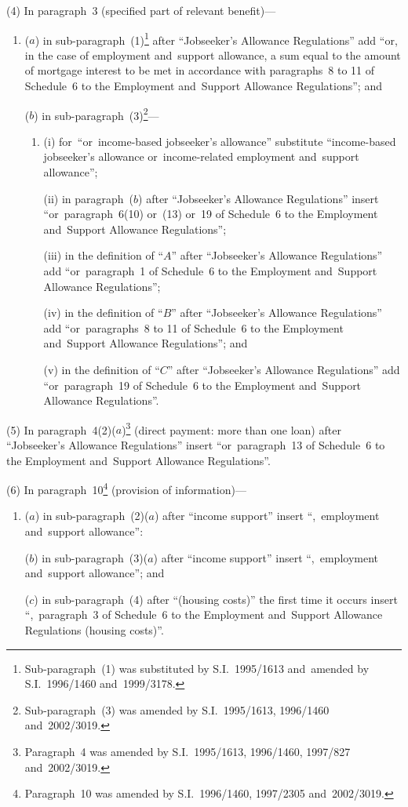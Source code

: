 \documentclass[12pt,a4paper]{article}
\begin{document}
(4) In paragraph~3 (specified part of relevant benefit)—
\begin{enumerate}\item[]
($a$) in sub-paragraph~(1)\footnote{Sub-paragraph~(1) was substituted by S.I.~1995/1613 and~amended by S.I.~1996/1460 and~1999/3178.} after “Jobseeker’s Allowance Regulations” add “or, in the case of employment and~support allowance, a sum equal to the amount of mortgage interest to be met in accordance with paragraphs~8 to 11 of Schedule~6 to the Employment and~Support Allowance Regulations”; and

($b$) in sub-paragraph~(3)\footnote{Sub-paragraph~(3) was amended by S.I.~1995/1613, 1996/1460 and~2002/3019.}—
\begin{enumerate}\item[]
(i) for~“or~income-based jobseeker’s allowance” substitute “income-based jobseeker’s allowance or~income-related employment and~support allowance”;

(ii) in paragraph~($b$)  after “Jobseeker’s Allowance Regulations” insert “or~paragraph~6(10) or~(13) or~19 of Schedule~6 to the Employment and~Support Allowance Regulations”;

(iii) in the definition of “$A$” after “Jobseeker’s Allowance Regulations” add “or~paragraph~1 of Schedule~6 to the Employment and~Support Allowance Regulations”;

(iv) in the definition of “$B$” after “Jobseeker’s Allowance Regulations” add “or~paragraphs~8 to 11 of Schedule~6 to the Employment and~Support Allowance Regulations”; and

(v) in the definition of “$C$” after “Jobseeker’s Allowance Regulations” add “or~paragraph~19 of Schedule~6 to the Employment and~Support Allowance Regulations”.
\end{enumerate}
\end{enumerate}

(5) In paragraph~4(2)($a$)\footnote{Paragraph~4 was amended by S.I.~1995/1613, 1996/1460, 1997/827 and~2002/3019.} (direct payment: more than one loan) after “Jobseeker’s Allowance Regulations” insert “or~paragraph~13 of Schedule~6 to the Employment and~Support Allowance Regulations”.

(6) In paragraph~10\footnote{Paragraph~10 was amended by S.I.~1996/1460, 1997/2305 and~2002/3019.} (provision of information)—
\begin{enumerate}\item[]
($a$) in sub-paragraph~(2)($a$)  after “income support” insert “,~employment and~support allowance”:

($b$) in sub-paragraph~(3)($a$)  after “income support” insert “,~employment and~support allowance”; and

($c$) in sub-paragraph~(4) after “(housing costs)” the first time it occurs insert “,~paragraph~3 of Schedule~6 to the Employment and~Support Allowance Regulations (housing costs)”.
\end{enumerate}
\end{document}
